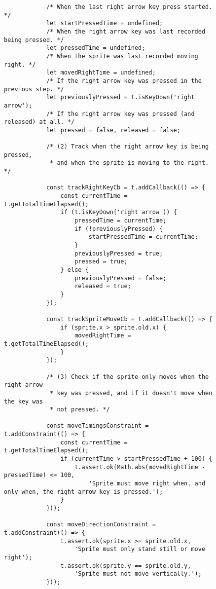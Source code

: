 \begin{listing}[htpb]
\begin{subfigure}[b]{.50\textwidth}
\begin{verbatim}
            /* When the last right arrow key press started. */
            let startPressedTime = undefined;
            /* When the right arrow key was last recorded being pressed. */
            let pressedTime = undefined;
            /* When the sprite was last recorded moving right. */
            let movedRightTime = undefined;
            /* If the right arrow key was pressed in the previous step. */
            let previouslyPressed = t.isKeyDown('right arrow');
            /* If the right arrow key was pressed (and released) at all. */
            let pressed = false, released = false;

            /* (2) Track when the right arrow key is being pressed,
             * and when the sprite is moving to the right. */

            const trackRightKeyCb = t.addCallback(() => {
                const currentTime = t.getTotalTimeElapsed();
                if (t.isKeyDown('right arrow')) {
                    pressedTime = currentTime;
                    if (!previouslyPressed) {
                        startPressedTime = currentTime;
                    }
                    previouslyPressed = true;
                    pressed = true;
                } else {
                    previouslyPressed = false;
                    released = true;
                }
            });

            const trackSpriteMoveCb = t.addCallback(() => {
                if (sprite.x > sprite.old.x) {
                    movedRightTime = t.getTotalTimeElapsed();
                }
            });

            /* (3) Check if the sprite only moves when the right arrow
             * key was pressed, and if it doesn't move when the key was
             * not pressed. */

            const moveTimingsConstraint = t.addConstraint(() => {
                const currentTime = t.getTotalTimeElapsed();
                if (currentTime > startPressedTime + 100) {
                    t.assert.ok(Math.abs(movedRightTime - pressedTime) <= 100,
                        'Sprite must move right when, and only when, the right arrow key is pressed.');
                }
            }));

            const moveDirectionConstraint = t.addConstraint(() => {
                t.assert.ok(sprite.x >= sprite.old.x,
                    'Sprite must only stand still or move right');
                t.assert.ok(sprite.y == sprite.old.y,
                    'Sprite must not move vertically.');
            }));


\end{verbatim}
\end{subfigure}
\end{listing}
